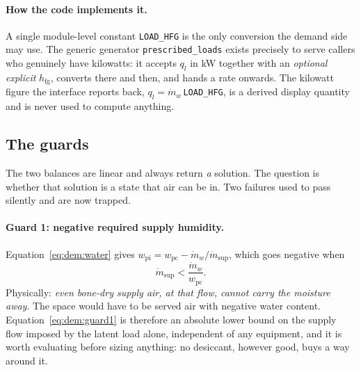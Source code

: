 \documentclass[11pt]{article}
\newcommand{\md}{\ensuremath{\dot m}}
\newcommand{\mdw}{\ensuremath{\dot m_{w}}}
\newcommand{\hfg}{\ensuremath{h_{\mathrm{fg}}}}
\newcommand{\ql}{\ensuremath{q_{l}}}
\begin{document}
\paragraph{How the code implements it.} A single module-level constant
\verb|LOAD_HFG| is the only conversion the demand side may use. The generic
generator \verb|prescribed_loads| exists precisely to serve callers who genuinely
have kilowatts: it accepts $\ql$ in \si{\kilo\watt} together with an
\emph{optional explicit} $\hfg$, converts there and then, and hands a rate
onwards. The kilowatt figure the interface reports back, $\ql=\mdw\,$\verb|LOAD_HFG|,
is a derived display quantity and is never used to compute anything.

\subsection{The guards}
\label{sec:dem:guards}

The two balances are linear and always return \emph{a} solution. The question is
whether that solution is a state that air can be in. Two failures used to pass
silently and are now trapped.

\paragraph{Guard 1: negative required supply humidity.} Equation~\eqref{eq:dem:water}
gives $w_{\mathrm{pi}}=w_{\mathrm{pc}}-\mdw/\md_{\mathrm{sup}}$, which goes
negative when
\begin{equation}
\md_{\mathrm{sup}}<\frac{\mdw}{w_{\mathrm{pc}}} .
\label{eq:dem:guard1}
\end{equation}
Physically: \emph{even bone-dry supply air, at that flow, cannot carry the
moisture away}. The space would have to be served air with negative water
content. Equation~\eqref{eq:dem:guard1} is therefore an absolute lower bound on
the supply flow imposed by the latent load alone, independent of any equipment,
and it is worth evaluating before sizing anything: no desiccant, however good,
buys a way around it.
\end{document}
